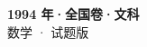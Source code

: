 \documentclass[zihao=-4, a4paper]{ctexart}
\begin{document}
\begin{center}
  {\Large\bfseries 1994 年·全国卷·文科}\\[4pt]
  {\large 数学 · 试题版}
\end{center}
\medskip
{}

\end{document}

